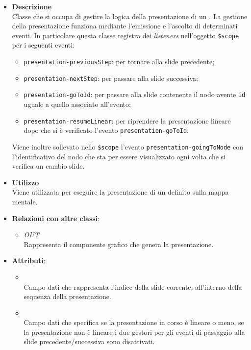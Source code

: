 \begin{itemize}
\item \textbf{Descrizione}\\
Classe che si occupa di gestire la logica della presentazione di un . La gestione della presentazione funziona mediante l'emissione e l'ascolto di determinati eventi.
In particolare questa classe registra dei \textit{listeners} nell'oggetto \texttt{\$scope} per i seguenti eventi:
\begin{itemize}
\item \texttt{presentation-previousStep}: per tornare alla slide precedente;
\item \texttt{presentation-nextStep}: per passare alla slide successiva;
\item \texttt{presentation-goToId}: per passare alla slide contenente il nodo avente \texttt{id} uguale a quello associato all'evento;
\item \texttt{presentation-resumeLinear}: per riprendere la presentazione lineare dopo che si è verificato l'evento \texttt{presentation-goToId}.
\end{itemize}
Viene inoltre sollevato nello \texttt{\$scope} l'evento \texttt{presentation-goingToNode} con l'identificativo del nodo che sta per essere visualizzato ogni volta che si verifica un cambio slide.
\item \textbf{Utilizzo}\\
Viene utilizzata per eseguire la presentazione di un  definito sulla mappa mentale.
\item \textbf{Relazioni con altre classi}:
\begin{itemize}
\item \textit{OUT} \hyperref[\nogloxy{Premi::Front-End::Directives::premiPresentation}]{}\\
Rappresenta il componente grafico che genera la presentazione.
\end{itemize}
\item \textbf{Attributi}:
\begin{itemize}
\item {}
\\ Campo dati che rappresenta l'indice della slide corrente, all'interno della sequenza della presentazione.
\item {}
\\ Campo dati che specifica se la presentazione in corso è lineare o meno, se la presentazione non è lineare i due gestori per gli eventi di passaggio alla slide precedente/successiva sono disattivati.

\end{itemize}
\end{itemize}
